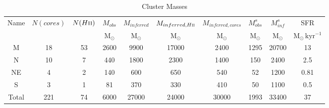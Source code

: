 \begin{table*}[htp]
\centering
\caption{Cluster Masses}
\begin{tabular}{cccccccccc}
\label{tab:clustermassestimates}
Name & $N(cores)$ & $N(H\textsc{ii})$ & $M_{obs}$ & $M_{inferred}$ & $M_{inferred, H\textsc{ii}}$ & $M_{inferred, cores}$ & $M_{obs}^s$ & $M_{inf}^s$ & SFR \\
 &  &  & $\mathrm{M_{\odot}}$ & $\mathrm{M_{\odot}}$ & $\mathrm{M_{\odot}}$ & $\mathrm{M_{\odot}}$ & $\mathrm{M_{\odot}}$ & $\mathrm{M_{\odot}}$ & $\mathrm{M_{\odot}\,kyr^{-1}}$ \\
\hline
M & 18 & 53 & 2600 & 9900 & 17000 & 2400 & 1295 & 20700 & 13 \\
N & 10 & 7 & 440 & 1800 & 2300 & 1400 & 150 & 2400 & 2.5 \\
NE & 4 & 2 & 140 & 600 & 650 & 540 & 52 & 1200 & 0.81 \\
S & 3 & 1 & 81 & 370 & 330 & 410 & 50 & 1100 & 0.5 \\
Total & 221 & 74 & 6000 & 27000 & 24000 & 30000 & 1993 & 33400 & 37 \\
\hline
\end{tabular}
\end{table*}
